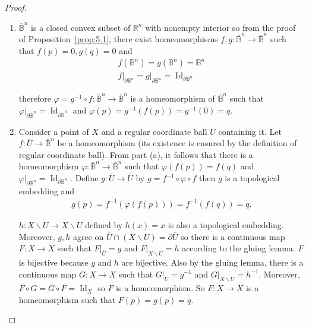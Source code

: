 \begin{proof}
	\begin{enumerate}[label={(\alph*)}]
		\item \( \overline{\mathbb{B}}^{n} \) is a closed convex subset of \( \mathbb{R}^{n} \) with nonempty interior so from the proof of Proposition~\ref{prop:5.1}, there exist homeomorphisms \( f, g: \overline{\mathbb{B}}^{n} \to \overline{\mathbb{B}}^{n} \) such that \( f(p) = 0, g(q) = 0 \) and
		      \begin{align*}
			      f(\mathbb{B}^{n}) = g(\mathbb{B}^{n}) = \mathbb{B}^{n} \\
			      f\vert_{\partial\mathbb{B}^{n}} = g\vert_{\partial\mathbb{B}^{n}} = \operatorname{Id}_{\partial\mathbb{B}^{n}}
		      \end{align*}

		      therefore \( \varphi = g^{-1}\circ f: \overline{\mathbb{B}}^{n} \to \overline{\mathbb{B}}^{n} \) is a homeomorphism of \( \overline{\mathbb{B}}^{n} \) such that \( \varphi\vert_{\partial\overline{\mathbb{B}}^{n}} = \operatorname{Id}_{\partial\overline{\mathbb{B}}^{n}} \) and \( \varphi(p) = g^{-1}(f(p)) = g^{-1}(0) = q \).
		\item Consider a point of \( X \) and a regular coordinate ball \( U \) containing it. Let \( f: \overline{U} \to \overline{\mathbb{B}}^{n} \) be a homeomorphism (its existence is ensured by the definition of regular coordinate ball). From part (a), it follows that there is a homeomorphism \( \varphi: \overline{\mathbb{B}}^{n} \to \overline{\mathbb{B}}^{n} \) such that \( \varphi(f(p)) = f(q) \) and \( \varphi\vert_{\partial\mathbb{B}^{n}} = \operatorname{Id}_{\partial\mathbb{B}^{n}} \). Define \( g: \overline{U} \to \overline{U} \) by \( g = f^{-1} \circ \varphi \circ f \) then \( g \) is a topological embedding and
		      \begin{align*}
			      g(p) = f^{-1}(\varphi(f(p))) = f^{-1}(f(q)) = q.
		      \end{align*}

		      \( h: X\smallsetminus U \to X\smallsetminus U \) defined by \( h(x) = x \) is also a topological embedding. Moreover, \( g, h \) agree on \( \overline{U} \cap (X \smallsetminus U) = \partial \overline{U} \) so there is a continuous map \( F: X \to X \) such that \( F\vert_{\overline{U}} = g \) and \( F\vert_{X\smallsetminus U} = h \) according to the gluing lemma. \( F \) is bijective because \( g \) and \( h \) are bijective. Also by the gluing lemma, there is a continuous map \( G: X\to X \) such that \( G\vert_{\overline{U}} = g^{-1} \) and \( G\vert_{X\smallsetminus U} = h^{-1} \). Moreover, \( F \circ G = G \circ F = \operatorname{Id}_{X} \) so \( F \) is a homeomorphism. So \( F: X\to X \) is a homeomorphism such that \( F(p) = g(p) = q \).


\end{enumerate}
\end{proof}

